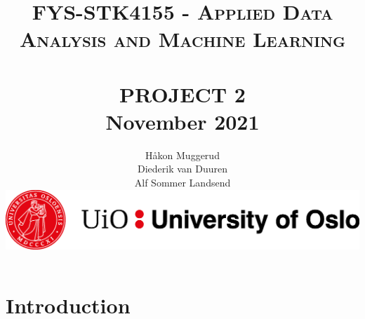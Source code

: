 \documentclass[12pt,a4paper]{article}
\title{	\normalsize \textsc{FYS-STK4155 - Applied Data Analysis and Machine Learning} 	%
		 	\\[2.0cm]								%
			\HRule{2pt} \\	[0.5cm]				%
			\LARGE \textbf{\uppercase{Project 2}}	%
			\HRule{2pt} \\ [0.5cm]		%
         \normalsize November 2021 \\
		}
\author{
		Håkon Muggerud\\
		Diederik van Duuren \\
		Alf Sommer Landsend
      \begin{center}       
         \includegraphics[width=\textwidth]{UiO.png}
      \end{center}
}
\makeatletter
\def\printtitle{%
   {\centering \@title\par}}
\def\printauthor{%
   {\centering \large \@author}}
\makeatother
\begin{document}
\thispagestyle{empty}		%

\printtitle					%
  	\vfill
\printauthor				%
\newpage

\tableofcontents
\thispagestyle{empty}
\newpage

\section{Introduction}


\end{document}
